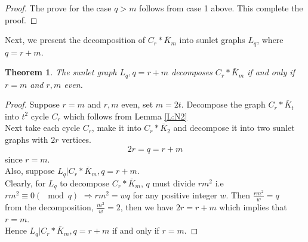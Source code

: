 \documentclass[12pt]{report}
\newtheorem{thm}{Theorem}[section]
\begin{document}
\begin{proof}
 The prove for the case $q>m$ follows from case 1 above. This complete the proof.
\end{proof}
Next, we present the decomposition of $C_{r}*\bar{K}_{m}$ into sunlet graphs $L_q$, where $q=r+m$.
\begin{thm}
The sunlet graph $L_q,q=r+m$ decomposes $C_{r}*\bar{K}_{m}$ if and
only if $r=m$ and $r,m$ even.
\end{thm}
\begin{proof}
Suppose $r=m$ and $r,m$ even,
set $m=2t$. Decompose the graph $C_{r}*\bar{K}_{t}$ into $t^2$ cycle $C_r$ which follows from Lemma \ref{L:N2}  \\
Next take each cycle $C_r$, make it into $C_{r}*\bar{K}_{2}$ and
decompose it into two sunlet graphs with $2r$ vertices.
$$2r=q=r+m$$ since $r=m$.\\
Also, suppose $L_q|C_{r}*\bar{K}_{m},q=r+m$.\\
Clearly, for $L_q$ to decompose $C_{r}*\bar{K}_{m}$, $q$ must divide
$rm^2$ i.e \\$rm^2\equiv 0(\mod q)$ $\Rightarrow rm^2=wq$ for any
positive integer $w$.
Then $\frac{rm^2}{w}=q$\\
from the decomposition, $\frac{m^2}{w}=2$, then we have $2r=r+m$ which implies that $r=m$.\\
Hence $L_q|C_{r}*\bar{K}_{m},q=r+m$ if and only if $r=m$.
\end{proof}
\end{document}
